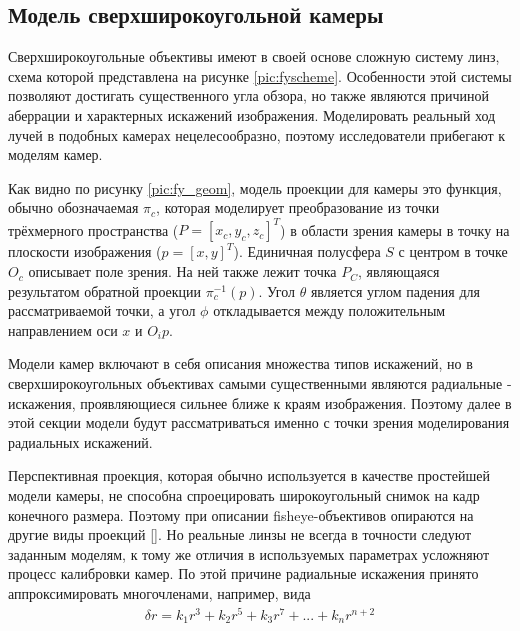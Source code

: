 \subsection{Модель сверхширокоугольной камеры}
\label{camera_model}
Сверхширокоугольные объективы имеют в своей основе сложную систему линз, схема которой представлена на рисунке \ref{pic:fyscheme}. 
Особенности этой системы позволяют достигать существенного угла обзора, но также являются причиной аберрации и характерных искажений 
изображения. Моделировать реальный ход лучей в подобных камерах нецелесообразно, поэтому исследователи прибегают к моделям камер.   %


Как видно по рисунку \ref{pic:fy_geom}, модель проекции для камеры это функция, обычно обозначаемая $\pi_c$, которая моделирует преобразование 
из точки трёхмерного пространства ($P=[x_c, y_c, z_c]^T$) в области зрения камеры в точку на плоскости изображения ($p=[x, y]^T$). Единичная            %
полусфера $S$ с центром в точке $O_c$ описывает поле зрения. На ней также лежит точка $P_C$, являющаяся результатом обратной проекции $\pi^{-1}_c({p})$.
Угол $\theta$ является углом падения для рассматриваемой точки, а угол $\phi$ откладывается между положительным направлением оси $x$ и $O_{i}{p}$. 


Модели камер включают в себя описания множества типов искажений, но в сверхширокоугольных объективах самыми существенными являются радиальные - искажения, проявляющиеся
сильнее ближе к краям изображения. Поэтому далее в этой секции модели будут рассматриваться именно с точки зрения моделирования радиальных искажений. 

Перспективная проекция, которая обычно используется в качестве простейшей модели камеры, не способна спроецировать широкоугольный снимок на кадр конечного размера. 
Поэтому при описании fisheye-объективов опираются на другие виды проекций \ref{}. Но реальные линзы не всегда в точности следуют заданным моделям, к тому же отличия 
в используемых параметрах усложняют процесс калибровки камер. По этой причине радиальные искажения принято аппроксимировать многочленами, например, вида
 \begin{equation}	%
	\begin{split}
        \delta r= k_1 r^3 + k_2 r^5 + k_3 r^7 + ... + k_n r^{n+2}
        \label{eqn:fisheye_distortion}
    \end{split}
\end{equation}

